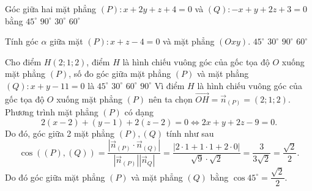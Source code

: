 \begin{ex}
	Góc giữa hai mặt phẳng $(P):x+2y+z+4=0$ và $(Q):-x+y+2z+3=0$ bằng
	\choice
	{$45^{\circ}$}
	{$90^{\circ}$}
	{$30^{\circ}$}
	{\True $60^{\circ}$}
\end{ex}
\begin{ex}
	Tính góc $\alpha$ giữa mặt $(P)\colon x+z-4=0$ và mặt phẳng $(Oxy)$.
	\choice
	{\True $45^\circ$}
	{$30^\circ$}
	{$90^\circ$}
	{$60^\circ$}
\end{ex}
\begin{ex}
	Cho điểm $H\left(2;1;2 \right)$, điểm $H$ là hình chiếu vuông góc của gốc tọa độ $O$ xuống mặt phẳng $\left(P \right)$, số đo góc giữa mặt phẳng $\left(P \right)$ và mặt phẳng $\left(Q \right):x+y-11=0$ là
	\choice
	{\True $45^\circ$}
	{$30^\circ$}
	{$60^\circ$}
	{$90^\circ$}
	\loigiai
	{
		Vì điểm $H$ là hình chiếu vuông góc của gốc tọa độ $O$ xuống mặt phẳng $(P)$ nên ta chọn
		$\vec{OH}=\vec{n}_{(P)}=(2;1;2)$.\\
		Phương trình mặt phẳng $(P)$ có dạng
		$$2\left(x-2\right)+\left(y-1\right)+2\left(z-2\right)=0\Leftrightarrow 2x+y+2z-9=0.$$
		Do đó, góc giữa 2 mặt phẳng $(P),(Q)$ tính như sau
		$$\cos \left((P),(Q)\right)=\dfrac{\left|{\vec{n}_{(P)}\cdot\vec{n}_{(Q)}}\right|}{\left|{\vec{n}_{(P)}}\right|\left|{\vec{n}_Q}\right|}=\dfrac{|2\cdot1+1\cdot1+2\cdot0|}{\sqrt{9}\cdot\sqrt{2}}=\dfrac{3}{3\sqrt{2}}=\dfrac{\sqrt{2}}{2}.$$
		Do đó góc giữa mặt phẳng $(P)$ và mặt phẳng $(Q)$ bằng $\cos 45^\circ=\dfrac{\sqrt{2}}{2}$.
	}
\end{ex}

